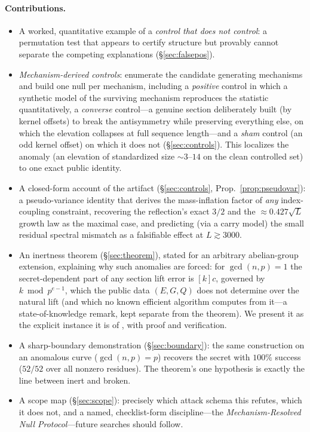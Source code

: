 \documentclass[11pt]{article}
\theoremstyle{definition}
\begin{document}
\paragraph{Contributions.}
\begin{itemize}
\item A worked, quantitative example of a \emph{control that does not
control}: a permutation test that appears to certify structure but
provably cannot separate the competing explanations
(\S\ref{sec:falsepos}).
\item \emph{Mechanism-derived controls}: enumerate the candidate
generating mechanisms and build one null per mechanism, including a
\emph{positive} control in which a synthetic model of the surviving
mechanism reproduces the statistic quantitatively, a \emph{converse}
control---a genuine section deliberately built (by kernel offsets) to
break the antisymmetry while preserving everything else, on which the
elevation collapses at full sequence length---and a \emph{sham} control
(an odd kernel offset) on which it does not (\S\ref{sec:controls}). This
localizes the anomaly (an elevation of standardized size $\sim$$3$--$14$
on the clean controlled set) to one exact public identity.
\item A closed-form account of the artifact (\S\ref{sec:controls},
Prop.~\ref{prop:pseudovar}): a pseudo-variance identity that derives the
mass-inflation factor of \emph{any} index-coupling constraint, recovering
the reflection's exact $3/2$ and the $\approx0.427\sqrt L$ growth law as
the maximal case, and predicting (via a carry model) the small residual
spectral mismatch as a falsifiable effect at $L\gtrsim 3000$.
\item An inertness theorem (\S\ref{sec:theorem}), stated for an arbitrary
abelian-group extension, explaining why such anomalies are forced: for
$\gcd(n,p)=1$ the secret-dependent part of any section lift error is
$[k]c$, governed by $k \bmod p^{e-1}$, which the public data $(E,G,Q)$
does not determine over the natural lift (and which no known efficient
algorithm computes from it---a state-of-knowledge remark, kept separate
from the theorem). We present it as the explicit instance it is of
\cite{silvermanlift,gadiyarpadma}, with proof and verification.
\item A sharp-boundary demonstration (\S\ref{sec:boundary}): the same
construction on an anomalous curve ($\gcd(n,p)=p$) recovers the secret
with $100\%$ success ($52/52$ over all nonzero residues). The theorem's
one hypothesis is exactly the line between inert and broken.
\item A scope map (\S\ref{sec:scope}): precisely which attack schema this
refutes, which it does not, and a named, checklist-form discipline---the
\emph{Mechanism-Resolved Null Protocol}---future searches should follow.
\end{itemize}
\end{document}
